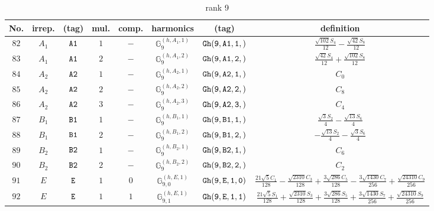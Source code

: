 \documentclass[fleqn,8pt]{jsarticle}
\begin{document}
\begin{table}[ht!]
\begin{center}
\caption{rank 9}
\renewcommand{\arraystretch}{1.3}
\begin{tabular}{cccccccc} \hline \hline
No. & irrep. & (tag) & mul. & comp. & harmonics & (tag) & definition \\ \hline
$ 82 $ & $ A_{1} $ & $ {\tt A1} $ & $ 1 $ & $ - $ & $ \mathbb{G}_{9}^{(h,A_{1},1)} $ & $ {\tt Gh(9,A1,1,)} $ & $ \frac{\sqrt{102} S_{4}}{12} - \frac{\sqrt{42} S_{8}}{12} $ \\
$ 83 $ & $ A_{1} $ & $ {\tt A1} $ & $ 2 $ & $ - $ & $ \mathbb{G}_{9}^{(h,A_{1},2)} $ & $ {\tt Gh(9,A1,2,)} $ & $ \frac{\sqrt{42} S_{4}}{12} + \frac{\sqrt{102} S_{8}}{12} $ \\
$ 84 $ & $ A_{2} $ & $ {\tt A2} $ & $ 1 $ & $ - $ & $ \mathbb{G}_{9}^{(h,A_{2},1)} $ & $ {\tt Gh(9,A2,1,)} $ & $ C_{0} $ \\
$ 85 $ & $ A_{2} $ & $ {\tt A2} $ & $ 2 $ & $ - $ & $ \mathbb{G}_{9}^{(h,A_{2},2)} $ & $ {\tt Gh(9,A2,2,)} $ & $ C_{8} $ \\
$ 86 $ & $ A_{2} $ & $ {\tt A2} $ & $ 3 $ & $ - $ & $ \mathbb{G}_{9}^{(h,A_{2},3)} $ & $ {\tt Gh(9,A2,3,)} $ & $ C_{4} $ \\
$ 87 $ & $ B_{1} $ & $ {\tt B1} $ & $ 1 $ & $ - $ & $ \mathbb{G}_{9}^{(h,B_{1},1)} $ & $ {\tt Gh(9,B1,1,)} $ & $ \frac{\sqrt{3} S_{2}}{4} - \frac{\sqrt{13} S_{6}}{4} $ \\
$ 88 $ & $ B_{1} $ & $ {\tt B1} $ & $ 2 $ & $ - $ & $ \mathbb{G}_{9}^{(h,B_{1},2)} $ & $ {\tt Gh(9,B1,2,)} $ & $ - \frac{\sqrt{13} S_{2}}{4} - \frac{\sqrt{3} S_{6}}{4} $ \\
$ 89 $ & $ B_{2} $ & $ {\tt B2} $ & $ 1 $ & $ - $ & $ \mathbb{G}_{9}^{(h,B_{2},1)} $ & $ {\tt Gh(9,B2,1,)} $ & $ C_{6} $ \\
$ 90 $ & $ B_{2} $ & $ {\tt B2} $ & $ 2 $ & $ - $ & $ \mathbb{G}_{9}^{(h,B_{2},2)} $ & $ {\tt Gh(9,B2,2,)} $ & $ C_{2} $ \\
$ 91 $ & $ E $ & $ {\tt E} $ & $ 1 $ & $ 0 $ & $ \mathbb{G}_{9,0}^{(h,E,1)} $ & $ {\tt Gh(9,E,1,0)} $ & $ \frac{21 \sqrt{5} C_{1}}{128} - \frac{\sqrt{2310} C_{3}}{128} + \frac{3 \sqrt{286} C_{5}}{128} - \frac{3 \sqrt{1430} C_{7}}{256} + \frac{\sqrt{24310} C_{9}}{256} $ \\
$ 92 $ & $ E $ & $ {\tt E} $ & $ 1 $ & $ 1 $ & $ \mathbb{G}_{9,1}^{(h,E,1)} $ & $ {\tt Gh(9,E,1,1)} $ & $ \frac{21 \sqrt{5} S_{1}}{128} + \frac{\sqrt{2310} S_{3}}{128} + \frac{3 \sqrt{286} S_{5}}{128} + \frac{3 \sqrt{1430} S_{7}}{256} + \frac{\sqrt{24310} S_{9}}{256} $ \\

\end{tabular}
\end{center}
\end{table}
\end{document}
